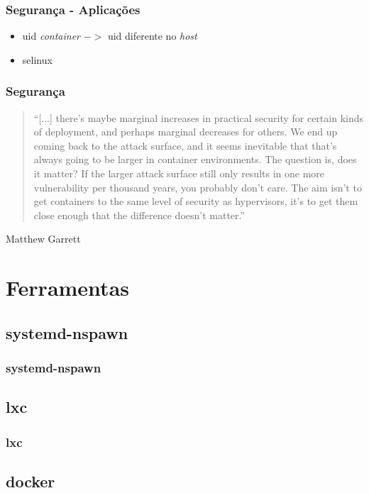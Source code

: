 \documentclass{beamer}
\begin{document}
\begin{frame}
    \frametitle{Segurança - Aplicações}
    \begin{itemize}
        \item uid \textit{container} $->$ uid diferente no \textit{host}
        \item selinux
    \end{itemize}
\end{frame}

\begin{frame}
    \frametitle{Segurança}
    \begin{quote}
        ``[...] there's maybe marginal increases in practical security for
        certain kinds of deployment, and perhaps marginal decreases for others.
        We end up coming back to the attack surface, and it seems inevitable
        that that's always going to be larger in container environments. The
        question is, does it matter? If the larger attack surface still only
        results in one more vulnerability per thousand years, you probably
        don't care. The aim isn't to get containers to the same level of
        security as hypervisors, it's to get them close enough that the
        difference doesn't matter.''
    \end{quote}
    Matthew Garrett
\end{frame}

\section{Ferramentas}

\subsection{systemd-nspawn}

\begin{frame}
    \frametitle{systemd-nspawn}
\end{frame}

\subsection{lxc}

\begin{frame}
    \frametitle{lxc}
\end{frame}

\subsection{docker}
\end{document}
